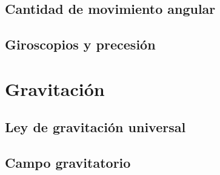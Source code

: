 ﻿\documentclass[11pt,letterpaper,openany]{book}
\newcommand{\rutaraiz}{../..}
\begin{document}




\chapter{Cantidad de movimiento angular}





\chapter{Giroscopios y precesión}





\part{Gravitación}



\chapter{Ley de gravitación universal}





\chapter{Campo gravitatorio}


\end{document}
